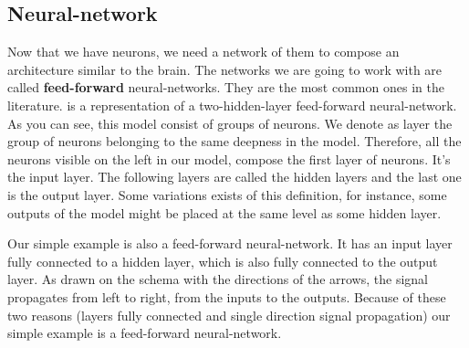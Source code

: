 	\subsection{Neural-network}
		Now that we have neurons, we need a network of them to compose an architecture similar to the brain. The networks we are going to work with are called \textbf{feed-forward} neural-networks. They are the most common ones in the literature.  is a representation of a two-hidden-layer feed-forward neural-network. As you can see, this model consist of groups of neurons. We denote as layer the group of neurons belonging to the same deepness in the model. Therefore, all the neurons visible on the left in our model, compose the first layer of neurons. It's the input layer. The following layers are called the hidden layers and the last one is the output layer. Some variations exists of this definition, for instance, some outputs of the model might be placed at the same level as some hidden layer.

		Our simple example is also a feed-forward neural-network. It has an input layer fully connected to a hidden layer, which is also fully connected to the output layer. As drawn on the schema with the directions of the arrows, the signal propagates from left to right, from the inputs to the outputs. Because of these two reasons (layers fully connected and single direction signal propagation) our simple example is a feed-forward neural-network.		

